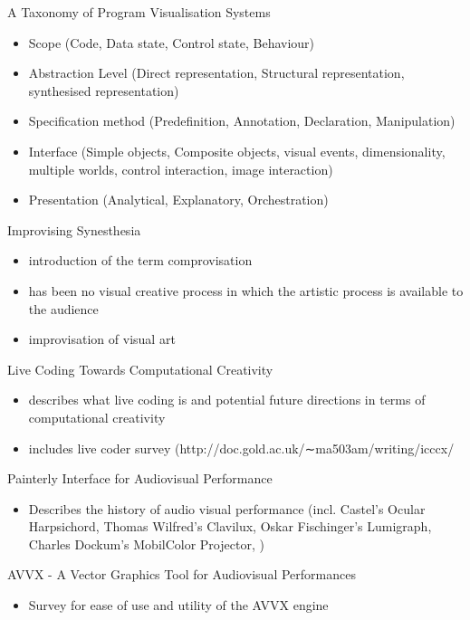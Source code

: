 A Taxonomy of Program Visualisation Systems
\begin{itemize}
\item Scope (Code, Data state, Control state, Behaviour)
\item Abstraction Level (Direct representation, Structural representation, synthesised representation)
\item Specification method (Predefinition, Annotation, Declaration, Manipulation)
\item Interface (Simple objects, Composite objects, visual events, dimensionality, multiple worlds, control interaction, image interaction)
\item Presentation (Analytical, Explanatory, Orchestration)
\end{itemize}

Improvising Synesthesia
\begin{itemize}
\item introduction of the term comprovisation
\item has been no visual creative process in which the artistic process is available to the audience
\item improvisation of visual art
\end{itemize}

Live Coding Towards Computational Creativity
\begin{itemize}
\item describes what live coding is and potential future directions in terms of computational creativity
\item includes live coder survey (http://doc.gold.ac.uk/∼ma503am/writing/icccx/
\end{itemize}

Painterly Interface for Audiovisual Performance
\begin{itemize}
\item Describes the history of audio visual performance (incl. Castel’s Ocular Harpsichord, Thomas Wilfred’s Clavilux, Oskar Fischinger’s Lumigraph, Charles Dockum’s MobilColor Projector, )
\end{itemize}

AVVX - A Vector Graphics Tool for Audiovisual Performances
\begin{itemize}
\item Survey for ease of use and utility of the AVVX engine
\end{itemize}

